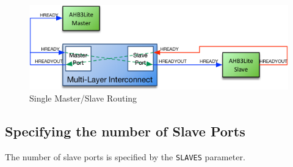 \begin{figure}[htb]
	\centering
	\includegraphics{assets/img/ahb-lite-switch-sys5}
	\caption{Single Master/Slave Routing}
	\label{fig:master-slave-routing}
\end{figure}

\newpage

\subsection{Specifying the number of Slave
Ports}\label{specifying-the-number-of-slave-ports}

The number of slave ports is specified by the \texttt{SLAVES} parameter.
